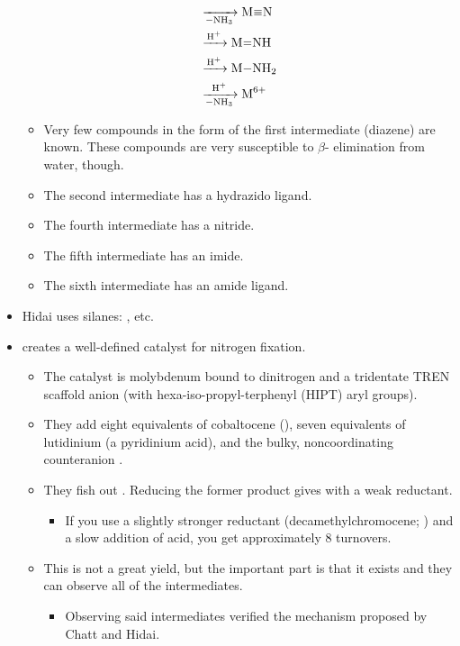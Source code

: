 \documentclass[../notes.tex]{subfiles}
\begin{document}
\begin{itemize}
\begin{align*}
        &\ce{->[][-NH3]} \ce{M#N}\\
        &\ce{->[H+]} \ce{M=NH}\\
        &\ce{->[H+]} \ce{M-NH2}\\
        &\ce{->[H+][-NH3]} \ce{M^{6+}}
    \end{align*}
    \begin{itemize}
        \item Very few compounds in the form of the first intermediate (diazene) are known. These compounds are very susceptible to $\beta$- elimination from water, though.
        \item The second intermediate has a hydrazido ligand.
        \item The fourth intermediate has a nitride.
        \item The fifth intermediate has an imide.
        \item The sixth intermediate has an amide ligand.
    \end{itemize}
    \item Hidai uses silanes: , etc.
    \item \textcite{bib:SchrockYandulov} creates a well-defined catalyst for nitrogen fixation.
    \begin{itemize}
        \item The catalyst is molybdenum bound to dinitrogen and a tridentate TREN scaffold anion (with hexa-iso-propyl-terphenyl (HIPT) aryl groups).
        \item They add eight equivalents of cobaltocene (), seven equivalents of lutidinium (a pyridinium acid), and the bulky, noncoordinating counteranion \ce{[BAr^F{}_4]-}.
        \item They fish out . Reducing the former product gives  with a weak reductant.
        \begin{itemize}
            \item If you use a slightly stronger reductant (decamethylchromocene; ) and a slow addition of acid, you get approximately 8 turnovers.
        \end{itemize}
        \item This is not a great yield, but the important part is that it exists and they can observe all of the intermediates.
        \begin{itemize}
            \item Observing said intermediates verified the mechanism proposed by Chatt and Hidai.

\end{itemize}
\end{itemize}
\end{itemize}
\end{document}
